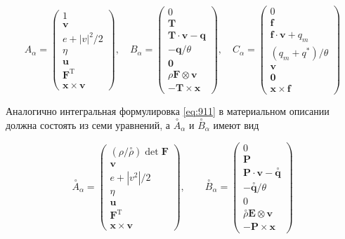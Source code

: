 \begin{equation}
A_{\alpha}=\left(\begin{array}{c}
1  \label{eq:912}\\
\mathbf{v} \\
e+|v|^{2} / 2 \\
\eta \\
\mathbf{u} \\
\mathbf{F}^{\mathrm{T}} \\
\mathbf{x} \times \mathbf{v}
\end{array}\right), \quad B_{\alpha}=\left(\begin{array}{c}
0 \\
\mathbf{T} \\
\mathbf{T} \cdot \mathbf{v}-\mathbf{q} \\
-\mathbf{q} / \theta \\
\mathbf{0} \\
\rho \mathbf{F} \otimes \mathbf{v} \\
-\mathbf{T} \times \mathbf{x}
\end{array}\right), \quad C_{\alpha}=\left(\begin{array}{c}
0 \\
\mathbf{f} \\
\mathbf{f} \cdot \mathbf{v}+q_{m} \\
\left(q_{m}+q^{*}\right) / \theta \\
\mathbf{v} \\
\mathbf{0} \\
\mathbf{x} \times \mathbf{f}
\end{array}\right)
\end{equation}

Аналогично интегральная формулировка \eqref{eq:911} в материальном описании должна состоять из семи уравнений, а $\stackrel{\circ}{A}_{\alpha}$ и $\stackrel{\circ}{B}_{\alpha}$ имеют вид

\begin{equation}
\stackrel{\circ}{A}_{\alpha}=\left(\begin{array}{c}
(\rho / \stackrel{\circ}{\rho}) \operatorname{det} \mathbf{F}  \label{eq:913}\\
\mathbf{v} \\
e+\left|v^{2}\right| / 2 \\
\eta \\
\mathbf{u} \\
\mathbf{F}^{\mathrm{T}} \\
\mathbf{x} \times \mathbf{v}
\end{array}\right), \quad \quad \stackrel{\circ}{B}_{\alpha}=\left(\begin{array}{c}
0 \\
\mathbf{P} \\
\mathbf{P} \cdot \mathbf{v}-\stackrel{\circ}{\mathbf{q}} \\
-\stackrel{\circ}{\mathbf{q}} / \theta \\
0 \\
\stackrel{\circ}{\rho} \mathbf{E} \otimes \mathbf{v} \\
-\mathbf{P} \times \mathbf{x}
\end{array}\right)
\end{equation}
